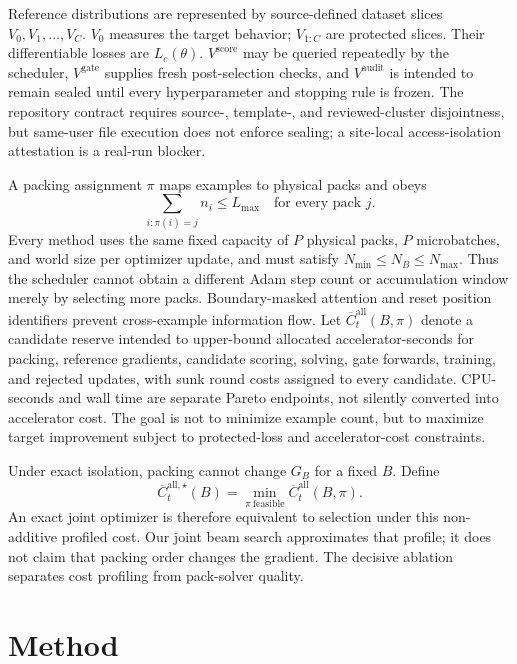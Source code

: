 \documentclass{article}
\begin{document}
Reference distributions are represented by source-defined dataset slices
$V_0,V_1,\ldots,V_C$. $V_0$ measures the target behavior; $V_{1:C}$ are
protected slices. Their differentiable losses are $L_c(\theta)$.
$V^{\mathrm{score}}$ may be queried repeatedly by the scheduler,
$V^{\mathrm{gate}}$ supplies fresh post-selection checks, and
$V^{\mathrm{audit}}$ is intended to remain sealed until every hyperparameter
and stopping rule is frozen. The repository contract requires source-,
template-, and reviewed-cluster disjointness, but same-user file execution does
not enforce sealing; a site-local access-isolation attestation is a real-run
blocker.

A packing assignment $\pi$ maps examples to physical packs and obeys
\begin{equation}
\sum_{i:\pi(i)=j} n_i\le L_{\max}\quad\text{for every pack }j.
\label{eq:packing}
\end{equation}
Every method uses the same fixed capacity of $P$ physical packs, $P$
microbatches, and world size per optimizer update, and must satisfy
$N_{\min}\le N_B\le N_{\max}$. Thus the scheduler cannot obtain a different
Adam step count or accumulation window merely by selecting more packs.
Boundary-masked attention and reset position identifiers prevent cross-example
information flow. Let
$\overline C_t^{\mathrm{all}}(B,\pi)$ denote a candidate reserve intended to
upper-bound allocated
accelerator-seconds for packing, reference gradients, candidate scoring,
solving, gate forwards, training, and rejected updates, with sunk round costs
assigned to every candidate. CPU-seconds and wall time are separate Pareto
endpoints, not silently converted into accelerator cost. The goal is not to
minimize example count, but to maximize target improvement subject to
protected-loss and accelerator-cost constraints.

Under exact isolation, packing cannot change $G_B$ for a fixed $B$. Define
\begin{equation}
\overline C_t^{\mathrm{all},\star}(B)=
\min_{\pi\ \mathrm{feasible}}\overline C_t^{\mathrm{all}}(B,\pi).
\label{eq:profiled-cost}
\end{equation}
An exact joint optimizer is therefore equivalent to selection under this
non-additive profiled cost. Our joint beam search approximates that profile; it
does not claim that packing order changes the gradient. The decisive ablation
separates cost profiling from pack-solver quality.

\section{Method}
\label{sec:method}
\end{document}

